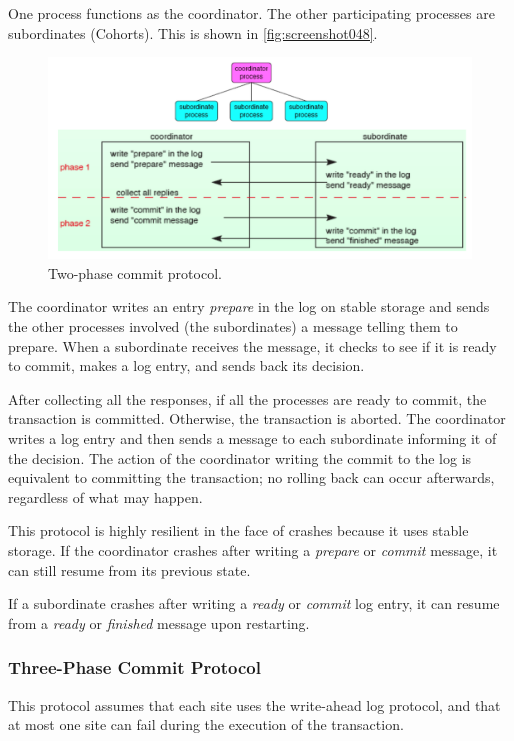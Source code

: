 One process functions as the coordinator. The other participating processes are subordinates (Cohorts). This is shown in \autoref{fig:screenshot048}.

\begin{figure}
\centering
\includegraphics[width=0.7\linewidth]{screenshot048}
\caption{Two-phase commit protocol.}
\label{fig:screenshot048}
\end{figure}

The coordinator writes an entry \textit{prepare} in the log on stable storage and sends the other processes involved (the subordinates) a message telling them to prepare. When a subordinate receives the message, it checks to see if it is ready to commit, makes a log entry, and sends back its decision. 

After collecting all the responses, if all the processes are ready to commit, the transaction is committed. Otherwise, the transaction is aborted. The coordinator writes a log entry and then sends a message to each subordinate informing it of the decision. The action of the coordinator writing the commit to the log is equivalent to committing the transaction; no rolling back can occur afterwards, regardless of what may happen.

This protocol is highly resilient in the face of crashes because it uses stable storage. If the coordinator crashes after writing a \textit{prepare} or \textit{commit} message, it can still resume from its previous state.

If a subordinate crashes after writing a \textit{ready} or \textit{commit} log entry, it can resume from a \textit{ready} or \textit{finished} message upon restarting.

\subsubsection{Three-Phase Commit Protocol}
This protocol assumes that each site uses the write-ahead log protocol, and that at most one site can fail during the execution of the transaction.

